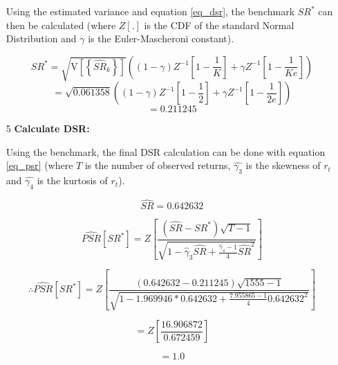 \documentclass[a4paper,11pt,oneside]{article}
\theoremstyle{plain}
\theoremstyle{definition}
\begin{document}
\begin{itemize}
		Using the estimated variance and equation \eqref{eq_dsr}, the benchmark $SR^*$ can then be calculated (where $Z[.]$ is the CDF of the standard Normal Distribution 
		and $\gamma$ is the Euler-Mascheroni constant).
		
		\begin{equation}
		S R^{*}=\sqrt{\mathrm{V}\left[\left\{\widehat{S R}_{k}\right\}\right]}\left((1-\gamma) Z^{-1}\left[1-\frac{1}{K}\right]+\gamma Z^{-1}\left[1-\frac{1}{K e}\right]\right)
		\end{equation}
		\begin{equation}
		=\sqrt{{0.061358}}\left((1-\gamma) Z^{-1}\left[1-\frac{1}{2}\right]+\gamma Z^{-1}\left[1-\frac{1}{2 e}\right]\right)
		\end{equation}
		\begin{equation}
		=0.211245
		\end{equation}
		
		\item [5] \textbf{Calculate DSR:} \newline
		
		Using the benchmark, the final DSR calculation can be done with equation \eqref{eq_psr} (where $T$ is the number of observed returns, $\hat{\gamma_3}$ is the skewness of $r_t$ and $\hat{\gamma_4}$ is the kurtosis of $r_t$).
		
		\begin{equation}
		\widehat{SR}=0.642632
		\end{equation}
		
		\begin{equation}
		\widehat{P S R}\left[S R^{*}\right]=Z\left[\frac{\left(\widehat{S R}-S R^{*}\right) \sqrt{T-1}}{\sqrt{1-\hat{\gamma}_{3} \widehat{S R}+\frac{\hat{\gamma}_{4}-1}{4} \widehat{S R}^{2}}}\right]
		\end{equation}
		
		\begin{equation}
		\therefore \widehat{P S R}\left[S R^{*}\right] =Z\left[\frac{\left({0.642632}-{0.211245}\right) \sqrt{1555-1}}{\sqrt{1-{1.969946}\ast{0.642632}+\frac{{7.955865}-1}{4}{0.642632}^{2}}}\right]
		\end{equation}
		
		\begin{equation}
		=Z\left[\frac{16.906872}{0.672459}\right]
		\end{equation}
		
		\begin{equation}
		= {1.0}
		\end{equation}
		
		
	\end{itemize}
	
\end{document}

